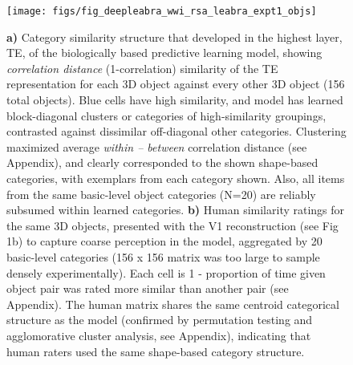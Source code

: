 \documentclass[11pt,twoside]{article}
\newif\myifpdf
\begin{document}
\begin{figure}
  \centering\texttt{[image: figs/fig\_deepleabra\_wwi\_rsa\_leabra\_expt1\_objs]}
  \caption{\footnotesize {\bf a)} Category similarity structure that developed in the highest layer, TE, of the biologically based predictive learning model, showing \emph{correlation distance} (1-correlation) similarity of the TE representation for each 3D object against every other 3D object (156 total objects).  Blue cells have high similarity, and model has learned block-diagonal clusters or categories of high-similarity groupings, contrasted against dissimilar off-diagonal other categories.  Clustering maximized average \emph{within -- between} correlation distance (see Appendix), and clearly corresponded to the shown shape-based categories, with exemplars from each category shown.  Also, all items from the same basic-level object categories (N=20) are reliably subsumed within learned categories. {\bf b)} Human similarity ratings for the same 3D objects, presented with the V1 reconstruction (see Fig 1b) to capture coarse perception in the model, aggregated by 20 basic-level categories (156 x 156 matrix was too large to sample densely experimentally).  Each cell is 1 - proportion of time given object pair was rated more similar than another pair (see Appendix).  The human matrix shares the same centroid categorical structure as the model (confirmed by permutation testing and agglomorative cluster analysis, see Appendix), indicating that human raters used the same shape-based category structure.}
  \label{fig.rsa}
\end{figure}
\end{document}
